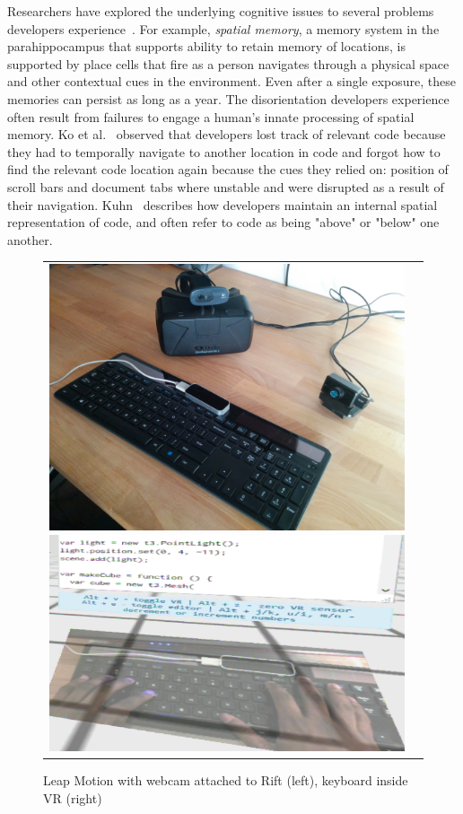 \documentclass[conference]{IEEEtran}
\begin{document}
Researchers have explored the underlying cognitive issues to several problems developers experience~\cite{Parnin:MemoryFailures}.
For example, \emph{spatial memory}, a memory system in the parahippocampus that supports ability to retain memory of locations, is supported by place cells that fire as a person navigates through a physical space and other contextual cues in the environment.  Even after a single exposure, these memories can persist as long as a year.  The disorientation developers experience often result from failures to engage a human's innate processing of spatial memory. Ko et al.~\cite{KoMaintenance06} observed that developers lost track of relevant code because they had to temporally navigate to another location in code and forgot how to find the relevant code location again because the cues they relied on: position of scroll bars and document tabs where unstable and were disrupted as a result of their navigation.  Kuhn~\cite{CodeMaps} describes how developers maintain an internal spatial representation of code, and often refer to code as being "above" or "below" one another.

\begin{figure}[ht]
\centering
\begin{tabular}{cc}
	\includegraphics[width=.45\linewidth]{figures/setup/equipment}\label{fig:rift}
 	\includegraphics[width=.45\linewidth]{figures/setup/webcam_passthrough}\label{fig:leap}
\end{tabular}
\caption{Leap Motion with webcam attached to Rift (left), keyboard inside VR (right)}
\end{figure}
\end{document}
